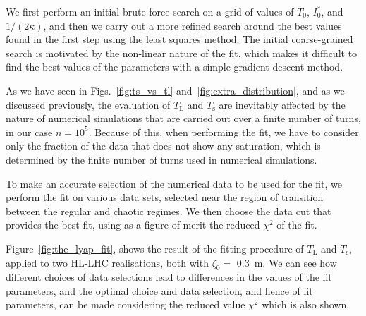 We first perform an initial brute-force search on a grid of values of $T_0$, $I_0^*$, and $1/(2\kappa)$, and then we carry out a more refined search around the best values found in the first step using the least squares method. The initial coarse-grained search is motivated by the non-linear nature of the fit, which makes it difficult to find the best values of the parameters with a simple gradient-descent method.

As we have seen in Figs.~\ref{fig:ts_vs_tl} and~\ref{fig:extra_distribution}, and as we discussed previously, the evaluation of $T_\mathrm{L}$ and $T_\mathrm{s}$ are inevitably affected by the nature of numerical simulations that are carried out over a finite number of turns, in our case $n=10^5$. Because of this, when performing the fit, we have to consider only the fraction of the data that does not show any saturation, which is determined by the finite number of turns used in numerical simulations. 

To make an accurate selection of the numerical data to be used for the fit, we perform the fit on various data sets, selected near the region of transition between the regular and chaotic regimes. We then choose the data cut that provides the best fit, using as a figure of merit the reduced $\chi^2$ of the fit.

Figure~\ref{fig:the_lyap_fit}, shows the result of the fitting procedure of $T_\mathrm{L}$ and $T_\mathrm{s}$, applied to two HL-LHC realisations, both with $\zeta_0=$ \SI{0.3}{\meter}. We can see how different choices of data selections lead to differences in the values of the fit parameters, and the optimal choice and data selection, and hence of fit parameters, can be made considering the reduced value $\chi^2$ which is also shown. 

